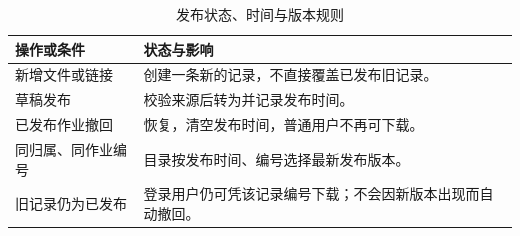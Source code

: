 \begin{table}[H]
  \centering
  \small
  \renewcommand{\arraystretch}{1.5}
  \caption{发布状态、时间与版本规则}
  \label{tab:coursework-states}
  \begin{tabularx}{\linewidth}{p{3cm}Y}
    \toprule
    \textbf{操作或条件} & \textbf{状态与影响} \\
    \midrule
    新增文件或链接 & 创建一条新的记录，不直接覆盖已发布旧记录。 \\
    草稿发布 & 校验来源后转为并记录发布时间。 \\
    已发布作业撤回 & 恢复，清空发布时间，普通用户不再可下载。 \\
    同归属、同作业编号 & 目录按发布时间、编号选择最新发布版本。 \\
    旧记录仍为已发布 & 登录用户仍可凭该记录编号下载；不会因新版本出现而自动撤回。 \\
    \bottomrule
  \end{tabularx}
\end{table}
